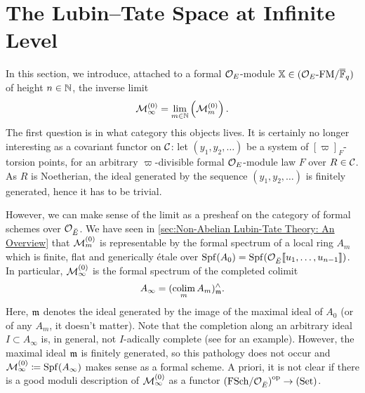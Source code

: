 \documentclass[../main.tex]{subfiles}
\begin{document}
\section{The Lubin--Tate Space at Infinite Level}
\label{sec:The Lubin--Tate Space at Infinite Level}

In this section, we introduce, attached to a formal $\mathcal{O}_E$-module
$\mathbb{X} \in {({\mathcal{O}_E}\textnormal-\allowbreak\mathrm{FM}/{{\overline{\mathbb{F}}_q}})}$ of height $n \in \mathbb{N}$, the inverse limit
\begin{equation*}
  \mathcal{M}_{\infty}^{(0)} = \lim_{m \in \mathbb{N}} \left(\mathcal{M}_{m}^{(0)}\right).
\end{equation*}
The first question is in what category this objects lives. It is
certainly no longer interesting as a covariant functor on $\mathcal{C}$: let $(y_1,
y_2, \dots)$ be a system of $[\varpi]_F$-torsion points,
for an arbitrary $\varpi$-divisible formal $\mathcal{O}_E$-module law $F$ over
$R \in \mathcal{C}$. As $R$ is Noetherian, the ideal generated by the sequence $(y_1,
y_2, \dots)$ is finitely generated, hence it has to be trivial.

However, we can make sense of the limit as a presheaf on the category of formal
schemes over $\mathcal{O}_{\breve {E}}$. We have seen in \cref{sec:Non-Abelian Lubin-Tate
Theory: An Overview} that $\mathcal{M}_{m}^{(0)}$ is 
representable by the formal spectrum of a local ring $A_m$ which
is finite, flat and generically \'etale
over $\operatorname{Spf}(A_0) = \operatorname{Spf}(\mathcal{O}_{{\breve {E}}}\llbracket u_1, \dots, u_{n-1}\rrbracket)$. In particular,
$\mathcal{M}_{\infty}^{(0)}$ is the formal spectrum of the completed colimit 
\begin{equation*}
  A_\infty = (\operatorname*{colim}_m A_m)^\wedge_{\mathfrak{m}}.
\end{equation*}
Here, $\mathfrak{m}$ denotes the ideal generated by the image of the maximal ideal of
$A_0$ (or of any $A_m$, it doesn't matter). 
Note that the completion along an arbitrary ideal $I \subset A_\infty$ is, in
general, not $I$-adically complete (see
\cite[\href{https://stacks.math.columbia.edu/tag/05JA}{Tag
05JA}]{stacks-project} for an example). However, the maximal ideal $\mathfrak{m}$ is
finitely generated, so this pathology does not occur and $\mathcal{M}_\infty^{(0)}
\coloneqq \operatorname{Spf}(A_\infty)$ makes sense as a formal scheme. A priori, it is not
clear if there is a good moduli description of $\mathcal{M}_\infty^{(0)}$ as a functor
${(\mathrm{FSch}/{\mathcal{O}_{\breve {E}}})}^{{\mathrm{op}}} \to {(\mathrm{Set})}$.
\end{document}
